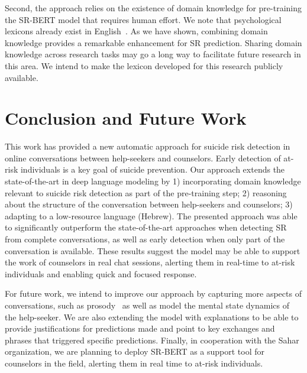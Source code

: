 \documentclass[letterpaper]{article} %
\begin{document}
Second,  the approach relies on the existence of domain knowledge for pre-training the SR-BERT model that requires human effort.
We note that  psychological lexicons already exist in English~\cite{lee2020cross}. As we have shown, combining  domain knowledge provides a remarkable enhancement for SR prediction. Sharing domain knowledge across research tasks may go a long way to facilitate future research in this area. We intend to make the lexicon developed for this research publicly available.
\section{Conclusion and Future Work}
This work has provided a new automatic approach for suicide risk detection in online conversations between help-seekers and counselors. Early detection of at-risk individuals is a key goal of suicide prevention.
Our approach extends the state-of-the-art in deep language modeling by 1) incorporating domain knowledge relevant to suicide risk detection as part of the pre-training step; 2) reasoning about the structure of the conversation between help-seekers and counselors; 3) adapting to a low-resource language (Hebrew).
The presented approach was able to  significantly outperform the state-of-the-art approaches when detecting SR from complete conversations, as well as early detection when only part of the conversation is available.
These results suggest the model may be able to support the work of counselors in real chat sessions, alerting them in real-time to at-risk individuals and enabling quick and focused response.

For future work, we intend to improve our approach by capturing more aspects of conversations, such as prosody~\cite{wilson2006relevance, kliper2010evidence} as well as model the mental state dynamics of the help-seeker.
We are also extending the model with  explanations to be able to provide justifications for predictions made and point to key exchanges and phrases that triggered specific predictions.
Finally, in cooperation with the Sahar organization, we are planning to deploy SR-BERT as a support tool for counselors in the field, alerting them in real time to at-risk individuals.
\end{document}
